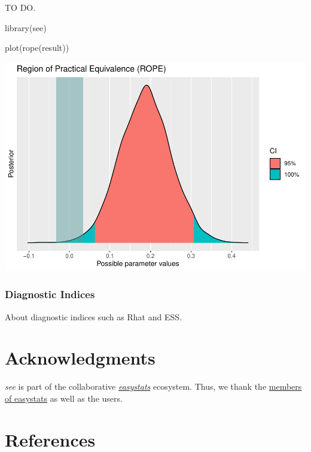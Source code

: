 \documentclass[10pt,a4paper,onecolumn]{article}
\newenvironment{Shaded}{\begin{snugshade}}{\end{snugshade}}
\newcommand{\FunctionTok}[1]{\textcolor[rgb]{0.00,0.00,0.00}{#1}}
\newcommand{\NormalTok}[1]{#1}
\begin{document}
TO DO.

\begin{Shaded}
\begin{Highlighting}[]
\FunctionTok{library}\NormalTok{(see)}

\FunctionTok{plot}\NormalTok{(}\FunctionTok{rope}\NormalTok{(result))}
\end{Highlighting}
\end{Shaded}

\includegraphics[width=1\linewidth]{paper_files/figure-latex/unnamed-chunk-42-1}

\hypertarget{diagnostic-indices}{%
\subsubsection{Diagnostic Indices}\label{diagnostic-indices}}

About diagnostic indices such as Rhat and ESS.

\hypertarget{acknowledgments}{%
\section{Acknowledgments}\label{acknowledgments}}

\emph{see} is part of the collaborative
\href{https://github.com/easystats/easystats}{\emph{easystats}}
ecosystem. Thus, we thank the
\href{https://github.com/orgs/easystats/people}{members of easystats} as
well as the users.

\hypertarget{references}{%
\section*{References}\label{references}}
\end{document}
